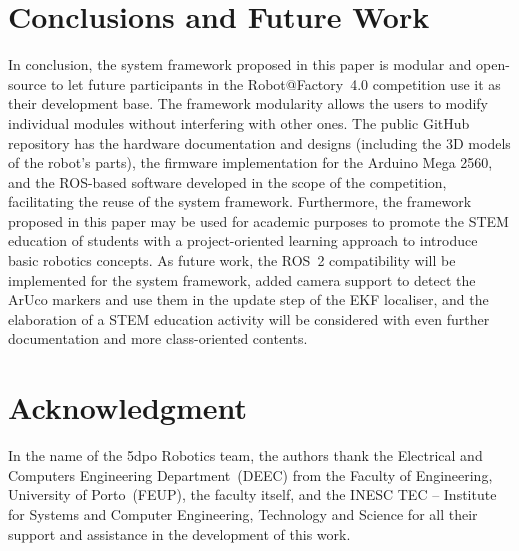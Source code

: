 \documentclass[conference]{IEEEtran}
\begin{document}
\section{Conclusions and Future Work}\label{sec:conclusions}

In conclusion, the system framework proposed in this paper is modular and open-source to let future participants in the Robot@Factory~4.0 competition use it as their development base.
The framework modularity allows the users to modify individual modules without interfering with other ones. The public GitHub repository has the hardware documentation and designs (including the 3D models of the robot's parts), the firmware implementation for the Arduino Mega 2560, and the ROS-based software developed in the scope of the competition, facilitating the reuse of the system framework.
Furthermore, the framework proposed in this paper may be used for academic purposes to promote the STEM education of students with a project-oriented learning approach to introduce basic robotics concepts.
As future work, the ROS~2 compatibility will be implemented for the system framework, added camera support to detect the ArUco markers and use them in the update step of the EKF localiser, and the elaboration of a STEM education activity will be considered with even further documentation and more class-oriented contents.





\section*{Acknowledgment}

In the name of the 5dpo Robotics team, the authors thank the Electrical and Computers Engineering Department~(DEEC) from the Faculty of Engineering, University of Porto~(FEUP), the faculty itself, and the INESC TEC -- Institute for Systems and Computer Engineering, Technology and Science for all their support and assistance in the development of this work.






\printbibliography
\end{document}
